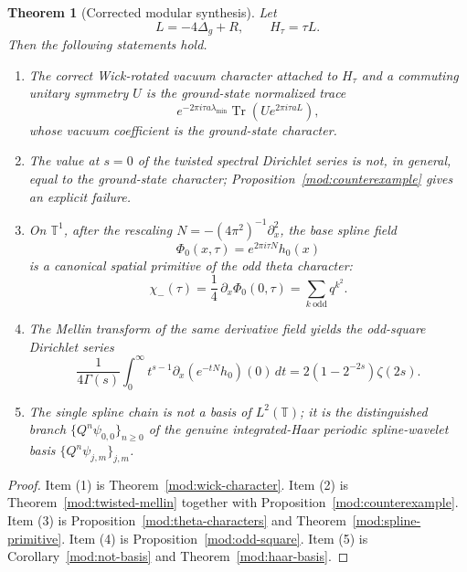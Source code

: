 \documentclass[11pt,a4paper]{article}
\numberwithin{equation}{section}
\newtheorem{theorem}{Theorem}[section]
\theoremstyle{definition}
\theoremstyle{remark}
\begin{document}
\begin{theorem}[Corrected modular synthesis]\label{mod:final}
Let
\[
L=-4\Delta_g+R,
\qquad
H_\tau=\tau L.
\]
Then the following statements hold.

\begin{enumerate}[label=(\arabic*)]
\item The correct Wick-rotated vacuum character attached to $H_\tau$ and a commuting unitary symmetry $U$ is the ground-state normalized trace
\[
e^{-2\pi i\tau a\lambda_{\min}}\operatorname{Tr}(Ue^{2\pi i\tau aL}),
\]
whose vacuum coefficient is the ground-state character.
\item The value at $s=0$ of the twisted spectral Dirichlet series is not, in general, equal to the ground-state character; Proposition~\ref{mod:counterexample} gives an explicit failure.
\item On $\mathbb T^1$, after the rescaling $N=-(4\pi^2)^{-1}\partial_x^2$, the base spline field
\[
\Phi_0(x,\tau)=e^{2\pi i\tau N}h_0(x)
\]
is a canonical spatial primitive of the odd theta character:
\[
\chi_-(\tau)=\frac14\,\partial_x\Phi_0(0,\tau)=\sum_{k\ \mathrm{odd}}q^{k^2}.
\]
\item The Mellin transform of the same derivative field yields the odd-square Dirichlet series
\[
\frac{1}{4\Gamma(s)}
\int_0^\infty t^{s-1}\partial_x(e^{-tN}h_0)(0)\,dt
=
2(1-2^{-2s})\zeta(2s).
\]
\item The single spline chain is not a basis of $L^2(\mathbb T)$; it is the distinguished branch $\{Q^n\psi_{0,0}\}_{n\ge 0}$ of the genuine integrated-Haar periodic spline-wavelet basis $\{Q^n\psi_{j,m}\}_{j,m}$.
\end{enumerate}
\end{theorem}

\begin{proof}
Item (1) is Theorem~\ref{mod:wick-character}.  Item (2) is Theorem~\ref{mod:twisted-mellin} together with Proposition~\ref{mod:counterexample}.  Item (3) is Proposition~\ref{mod:theta-characters} and Theorem~\ref{mod:spline-primitive}.  Item (4) is Proposition~\ref{mod:odd-square}.  Item (5) is Corollary~\ref{mod:not-basis} and Theorem~\ref{mod:haar-basis}.
\end{proof}
\end{document}
